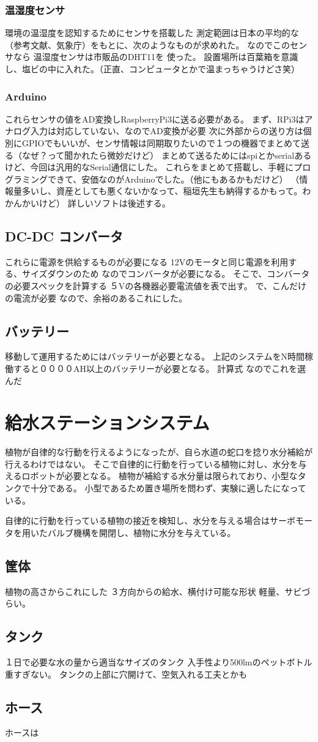\subsubsection{温湿度センサ}
環境の温湿度を認知するためにセンサを搭載した
測定範囲は日本の平均的な（参考文献、気象庁）をもとに、次のようなものが求めれた。
なのでこのセンサなら
温湿度センサは市販品のDHT11を
使った。
設置場所は百葉箱を意識し、塩ビの中に入れた。（正直、コンピュータとかで温まっちゃうけどさ笑）
\subsubsection{Arduino}
これらセンサの値をAD変換しRaspberryPi3に送る必要がある。
まず、RPi3はアナログ入力は対応していない、なのでAD変換が必要
次に外部からの送り方は個別にGPIOでもいいが、センサ情報は同期取りたいので１つの機器でまとめて送る（なぜ？って聞かれたら微妙だけど）
まとめて送るためにはspiとかserialあるけど、今回は汎用的なSerial通信にした。
これらをまとめて搭載し、手軽にプログラミングできて、安価なのがArduinoでした。（他にもあるかもだけど）
（情報量多いし、資産としても悪くないかなって、稲垣先生も納得するかもって。わかんかいけど）
詳しいソフトは後述する。
\subsection{DC-DC コンバータ}
これらに電源を供給するものが必要になる
12Vのモータと同じ電源を利用する、サイズダウンのため
なのでコンバータが必要になる。
そこで、コンバータの必要スペックを計算する
５Vの各機器必要電流値を表で出す。
で、こんだけの電流が必要
なので、余裕のあるこれにした。
\subsection{バッテリー}
移動して運用するためにはバッテリーが必要となる。
上記のシステムをN時間稼働すると００００AH以上のバッテリーが必要となる。
計算式
なのでこれを選んだ

\section{給水ステーションシステム}
植物が自律的な行動を行えるようになったが、自ら水道の蛇口を捻り水分補給が行えるわけではない。
そこで自律的に行動を行っている植物に対し、水分を与えるロボットが必要となる。
植物が補給する水分量は限られており、小型なタンクで十分である。
小型であるため置き場所を問わず、実験に適したになっている。
\par 自律的に行動を行っている植物の接近を検知し、水分を与える場合はサーボモータを用いたバルブ機構を開閉し、植物に水分を与えている。

\subsection{筐体}
植物の高さからこれにした
３方向からの給水、横付け可能な形状
軽量、サビづらい。

\subsection{タンク}
１日で必要な水の量から適当なサイズのタンク
入手性より500lmのペットボトル
重すぎない。
タンクの上部に穴開けて、空気入れる工夫とかも

\subsection{ホース}
ホースは
